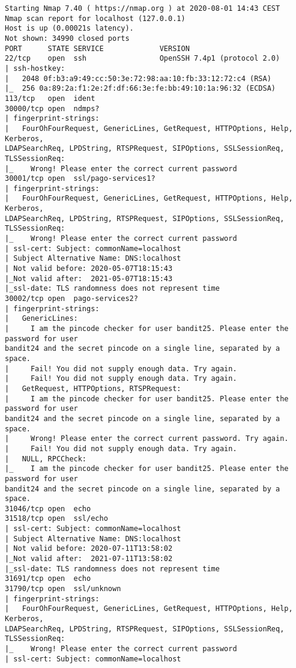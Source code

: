 \documentclass[a4paper]{report}
\begin{document}
\begin{verbatim}
Starting Nmap 7.40 ( https://nmap.org ) at 2020-08-01 14:43 CEST
Nmap scan report for localhost (127.0.0.1)
Host is up (0.00021s latency).
Not shown: 34990 closed ports
PORT      STATE SERVICE             VERSION
22/tcp    open  ssh                 OpenSSH 7.4p1 (protocol 2.0)
| ssh-hostkey: 
|   2048 0f:b3:a9:49:cc:50:3e:72:98:aa:10:fb:33:12:72:c4 (RSA)
|_  256 0a:89:2a:f1:2e:2f:df:66:3e:fe:bb:49:10:1a:96:32 (ECDSA)
113/tcp   open  ident
30000/tcp open  ndmps?
| fingerprint-strings: 
|   FourOhFourRequest, GenericLines, GetRequest, HTTPOptions, Help, Kerberos,
LDAPSearchReq, LPDString, RTSPRequest, SIPOptions, SSLSessionReq, TLSSessionReq: 
|_    Wrong! Please enter the correct current password
30001/tcp open  ssl/pago-services1?
| fingerprint-strings: 
|   FourOhFourRequest, GenericLines, GetRequest, HTTPOptions, Help, Kerberos, 
LDAPSearchReq, LPDString, RTSPRequest, SIPOptions, SSLSessionReq, TLSSessionReq: 
|_    Wrong! Please enter the correct current password
| ssl-cert: Subject: commonName=localhost
| Subject Alternative Name: DNS:localhost
| Not valid before: 2020-05-07T18:15:43
|_Not valid after:  2021-05-07T18:15:43
|_ssl-date: TLS randomness does not represent time
30002/tcp open  pago-services2?
| fingerprint-strings: 
|   GenericLines: 
|     I am the pincode checker for user bandit25. Please enter the password for user 
bandit24 and the secret pincode on a single line, separated by a space.
|     Fail! You did not supply enough data. Try again.
|     Fail! You did not supply enough data. Try again.
|   GetRequest, HTTPOptions, RTSPRequest: 
|     I am the pincode checker for user bandit25. Please enter the password for user 
bandit24 and the secret pincode on a single line, separated by a space.
|     Wrong! Please enter the correct current password. Try again.
|     Fail! You did not supply enough data. Try again.
|   NULL, RPCCheck: 
|_    I am the pincode checker for user bandit25. Please enter the password for user 
bandit24 and the secret pincode on a single line, separated by a space.
31046/tcp open  echo
31518/tcp open  ssl/echo
| ssl-cert: Subject: commonName=localhost
| Subject Alternative Name: DNS:localhost
| Not valid before: 2020-07-11T13:58:02
|_Not valid after:  2021-07-11T13:58:02
|_ssl-date: TLS randomness does not represent time
31691/tcp open  echo
31790/tcp open  ssl/unknown
| fingerprint-strings: 
|   FourOhFourRequest, GenericLines, GetRequest, HTTPOptions, Help, Kerberos, 
LDAPSearchReq, LPDString, RTSPRequest, SIPOptions, SSLSessionReq, TLSSessionReq: 
|_    Wrong! Please enter the correct current password
| ssl-cert: Subject: commonName=localhost

\end{verbatim}
\end{document}
